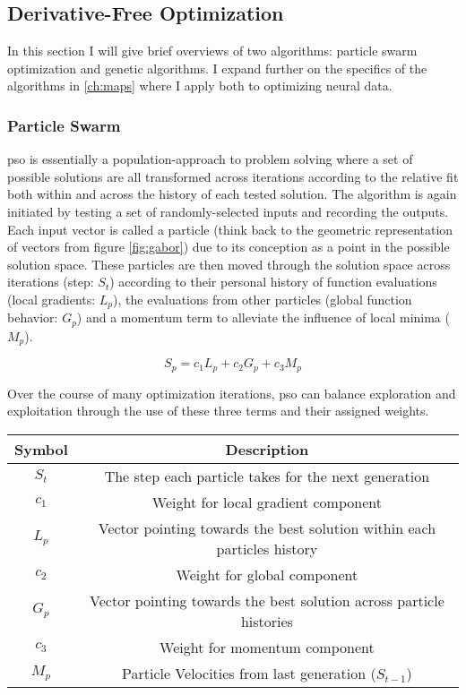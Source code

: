 \subsection{Derivative-Free Optimization}
\label{sec:DerivF}
In this section I will give brief overviews of two algorithms: particle swarm optimization and genetic algorithms. I expand further on the specifics of the algorithms in \ref{ch:maps} where I apply both to optimizing neural data.

\subsubsection*{Particle Swarm}

\gls{pso} is essentially a population-approach to problem solving where a set of possible solutions are all transformed across iterations according to the relative fit both within and across the history of each tested solution. The algorithm is again initiated by testing a set of randomly-selected inputs and recording the outputs. Each input vector is called a particle (think back to the geometric representation of vectors from figure \ref{fig:gabor}) due to its conception as a point in the possible solution space. These particles are then moved through the solution space across iterations (step: $S_t$) according to their personal history of function evaluations (local gradients: $L_p$), the evaluations from other particles (global function behavior: $G_p$) and a momentum term to alleviate the influence of local minima ($M_p$).

\begin{equation}
	S_p= c_1 L_p+ c_2  G_p + c_3 M_p
\end{equation}

Over the course of many optimization iterations, \gls{pso} can balance exploration and exploitation through the use of these three terms and their assigned weights.

\begin{table}[b]
	\centering
	\begin{tabular}{|c|c|}
		\hline
		\textbf{Symbol}       & \textbf{Description} \\
		\hline
		$S_t$      			 & The step each particle takes for the next generation \\
		$c_1$  				 & Weight for local gradient component  \\
		$L_p$   			 & Vector pointing towards the best solution within each particles history \\
		$c_2$         	     & Weight for global component \\
		$G_p$             	 &  Vector pointing towards the best solution across particle histories \\
		$c_3$             	 &  Weight for momentum component \\
		$M_p$             	 &  Particle Velocities from last generation ($S_{t-1}$)\\
		\hline
	\end{tabular}
	\label{tbl:symbols}
\end{table}

